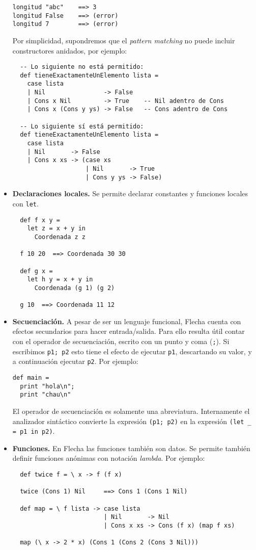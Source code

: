 \documentclass{article}
\newcommand{\flecha}{\textsf{Flecha}\xspace}
\newcommand{\fl}[1]{\texttt{#1}}
\begin{document}
\begin{itemize}
\begin{verbatim}
longitud "abc"    ==> 3
longitud False    ==> (error)
longitud 7        ==> (error)
\end{verbatim}
Por simplicidad, supondremos que el {\em pattern matching}
no puede incluir constructores anidados, por ejemplo:
\begin{verbatim} 
  -- Lo siguiente no está permitido:
  def tieneExactamenteUnElemento lista =
    case lista
    | Nil                -> False
    | Cons x Nil         -> True    -- Nil adentro de Cons
    | Cons x (Cons y ys) -> False   -- Cons adentro de Cons

  -- Lo siguiente sí está permitido:
  def tieneExactamenteUnElemento lista =
    case lista
    | Nil       -> False
    | Cons x xs -> (case xs
                    | Nil       -> True
                    | Cons y ys -> False)
\end{verbatim}
\item {\bf Declaraciones locales.}
  Se permite declarar constantes y funciones locales con \fl{let}.
\begin{verbatim}
  def f x y =
    let z = x + y in
      Coordenada z z

  f 10 20  ==> Coordenada 30 30

  def g x =
    let h y = x + y in
      Coordenada (g 1) (g 2)

  g 10  ==> Coordenada 11 12
\end{verbatim}
\item {\bf Secuenciación.}
  A pesar de ser un lenguaje funcional, \flecha cuenta con efectos
  secundarios para hacer entrada/salida.
  Para ello resulta útil contar con el operador de secuenciación,
  escrito con un punto y coma (\fl{;}).
  Si escribimos \texttt{p1; p2} esto tiene el efecto de ejecutar
  \texttt{p1}, descartando su valor, y a continuación ejecutar
  \texttt{p2}. Por ejemplo:
\begin{verbatim}
def main =
  print "hola\n";
  print "chau\n"
\end{verbatim}
El operador de secuenciación es solamente una abreviatura.
Internamente el analizador sintáctico convierte
la expresión \texttt{(p1; p2)}
en la expresión \fl{(let _ = p1 in p2)}.
\item {\bf Funciones.}
En \flecha las funciones también son datos.
Se permite también definir funciones anónimas con notación {\em lambda}.
Por ejemplo:
\begin{verbatim}
  def twice f = \ x -> f (f x)

  twice (Cons 1) Nil     ==> Cons 1 (Cons 1 Nil)

  def map = \ f lista -> case lista
                         | Nil       -> Nil
                         | Cons x xs -> Cons (f x) (map f xs)

  map (\ x -> 2 * x) (Cons 1 (Cons 2 (Cons 3 Nil)))
\end{verbatim}
\end{itemize}
\end{document}
